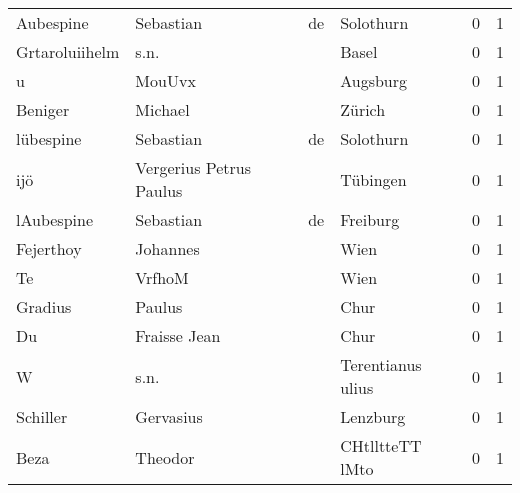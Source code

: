 \documentclass[10pt,a4paper,landscape]{article}
\begin{document}
\begin{longtable}{llllrr}
                Aubespine &                          Sebastian &          de &                                   Solothurn &          0 &         1 \\
           Grtaroluiihelm &                               s.n. &             &                                       Basel &          0 &         1 \\
                        u &                             MouUvx &             &                                    Augsburg &          0 &         1 \\
                  Beniger &                            Michael &             &                                      Zürich &          0 &         1 \\
                lübespine &                          Sebastian &          de &                                   Solothurn &          0 &         1 \\
                      ijö &            Vergerius Petrus Paulus &             &                                    Tübingen &          0 &         1 \\
               lAubespine &                          Sebastian &          de &                                    Freiburg &          0 &         1 \\
                Fejerthoy &                           Johannes &             &                                        Wien &          0 &         1 \\
                       Te &                             VrfhoM &             &                                        Wien &          0 &         1 \\
                  Gradius &                             Paulus &             &                                        Chur &          0 &         1 \\
                       Du &                       Fraisse Jean &             &                                        Chur &          0 &         1 \\
                        W &                               s.n. &             &                           Terentianus ulius &          0 &         1 \\
                 Schiller &                          Gervasius &             &                                    Lenzburg &          0 &         1 \\
                     Beza &                            Theodor &             &                             CHtlltteTT lMto &          0 &         1 \\

\end{longtable}
\end{document}
